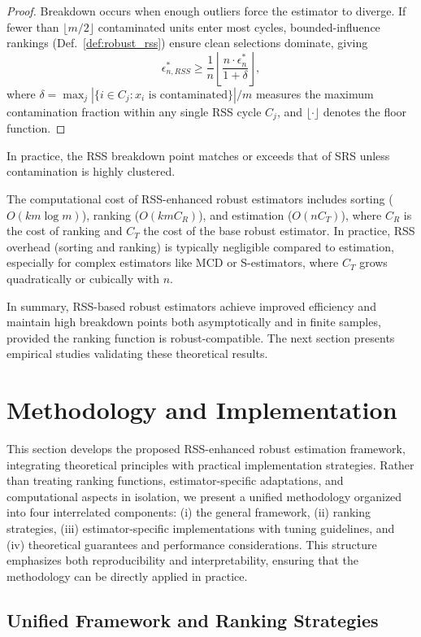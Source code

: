 \documentclass[12pt]{article}
\begin{document}
\begin{proof}
Breakdown occurs when enough outliers force the estimator to diverge. If fewer than $\lfloor m/2 \rfloor$ contaminated units enter most cycles, bounded-influence rankings (Def.~\ref{def:robust_rss}) ensure clean selections dominate, giving
\[
\epsilon^*_{n,RSS} \geq \frac{1}{n} \left\lfloor \frac{n \cdot \epsilon^*_n}{1 + \delta} \right\rfloor,
\]
where $\delta = \max_{j} |\{i \in C_j : x_i \text{ is contaminated}\}|/m$ measures the maximum contamination fraction within any single RSS cycle $C_j$, and $\lfloor \cdot \rfloor$ denotes the floor function.
\end{proof}
In practice, the RSS breakdown point matches or exceeds that of SRS unless contamination is highly clustered.

The computational cost of RSS-enhanced robust estimators includes sorting ($O(km \log m)$), ranking ($O(km C_R)$), and estimation ($O(n C_T)$), where $C_R$ is the cost of ranking and $C_T$ the cost of the base robust estimator. In practice, RSS overhead (sorting and ranking) is typically negligible compared to estimation, especially for complex estimators like MCD or S-estimators, where $C_T$ grows quadratically or cubically with $n$.

In summary, RSS-based robust estimators achieve improved efficiency and maintain high breakdown points both asymptotically and in finite samples, provided the ranking function is robust-compatible. The next section presents empirical studies validating these theoretical results.

\section{Methodology and Implementation}
\label{sec:methodology}

This section develops the proposed RSS-enhanced robust estimation framework, integrating theoretical principles with practical implementation strategies. Rather than treating ranking functions, estimator-specific adaptations, and computational aspects in isolation, we present a unified methodology organized into four interrelated components: (i) the general framework, (ii) ranking strategies, (iii) estimator-specific implementations with tuning guidelines, and (iv) theoretical guarantees and performance considerations. This structure emphasizes both reproducibility and interpretability, ensuring that the methodology can be directly applied in practice.

\subsection{Unified Framework and Ranking Strategies}
\end{document}
